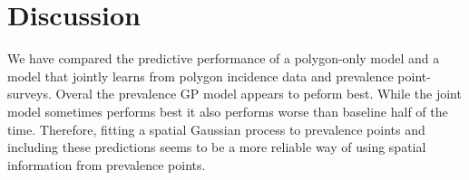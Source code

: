 \documentclass{statsoc}
\begin{document}
\begin{table}
\caption{\label{table3}Summary of coverage of 80\% credible intervals. The proportion of held out data points that fall within their 80\% credible intervals. 
Cases where this is below 0.7 are highlighted in bold.}
\centering
{}
\end{table}


\section*{Discussion}



We have compared the predictive performance of a polygon-only model and a model that jointly learns from polygon incidence data and prevalence point-surveys.
Overal the prevalence GP model appears to peform best.
While the joint model sometimes performs best it also performs worse than baseline half of the time.
Therefore, fitting a spatial Gaussian process to prevalence points and including these predictions seems to be a more reliable way of using spatial information from prevalence points.


%



\end{document}
